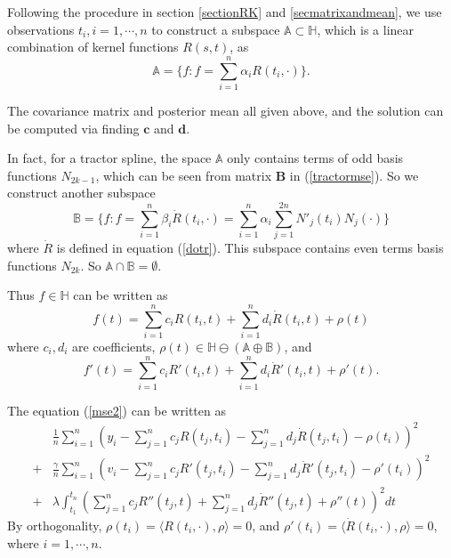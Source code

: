 Following the procedure in section \ref{sectionRK} and \ref{secmatrixandmean}, we use observations $t_i, i=1, \cdots, n$ to construct a subspace $\mathbb{A}\subset\mathbb{H}$, which is a linear combination of kernel functions $R(s,t)$, as
\begin{equation}
\mathbb{A}=\{f: f=\sum_{i=1}^{n}\alpha_iR(t_i,\cdot)\}.
\end{equation}

The covariance matrix and posterior mean all given above, and the solution can be computed via finding $\mathbf{c}$ and $\mathbf{d}$.

In fact, for a tractor spline, the space $\mathbb{A}$ only contains terms of odd basis functions $N_{2k-1}$, which can be seen from matrix $\mathbf{B}$ in (\ref{tractormse}). So we construct another subspace
\begin{equation}
\mathbb{B}=\{f: f=\sum_{i=1}^{n}\beta_i \dot{R}(t_i,\cdot)=\sum_{i=1}^{n}\alpha_i \sum_{j=1}^{2n}N'_j(t_i)N_j(\cdot)\} 
\end{equation}
where $\dot{R}$ is defined in equation (\ref{dotr}). This subspace contains even terms basis functions $N_{2k}$. So $\mathbb{A} \cap \mathbb{B} = \emptyset$. 

Thus $f \in \mathbb{H}$ can be written as
\begin{equation}\label{etaeq}
f(t)=\sum_{i=1}^{n}c_iR(t_i,t)+\sum_{i=1}^{n}d_i \dot{R}(t_i,t)+\rho(t)
\end{equation}
where $c_i, d_i$ are coefficients, $\rho(t) \in \mathbb{H} \ominus (\mathbb{A} \oplus \mathbb{B})$, and 
\begin{equation}\label{etaeq2}
f'(t)=\sum_{i=1}^{n}c_iR'(t_i,t)+\sum_{i=1}^{n}d_i \dot{R}'(t_i,t)+\rho'(t).
\end{equation}

The equation (\ref{mse2}) can be written as
\begin{equation}
\begin{split}
&\frac{1}{n}\sum_{i=1}^n (y_i -\sum_{j=1}^{n}c_jR(t_j,t_i)- \sum_{j=1}^{n}d_j\dot{R}(t_j,t_i) -\rho(t_i))^2\\
+&\frac{\gamma}{n}\sum_{i=1}^n (v_i -\sum_{j=1}^{n}c_jR'(t_j,t_i)- \sum_{j=1}^{n}d_j\dot{R}'(t_j,t_i) -\rho'(t_i))^2\\
+&\lambda \int_{t_1}^{t_n} (\sum_{j=1}^{n}c_jR''(t_j,t)+ \sum_{j=1}^{n}d_j\dot{R}''(t_j,t) +\rho''(t))^2dt
\end{split}
\end{equation}
By orthogonality, $\rho(t_i) = \langle R(t_i,\cdot),\rho\rangle=0$, %
and $\rho'(t_i) = \langle\dot{R}(t_i,\cdot),\rho\rangle=0$, where $i=1,\cdots,n$. 

